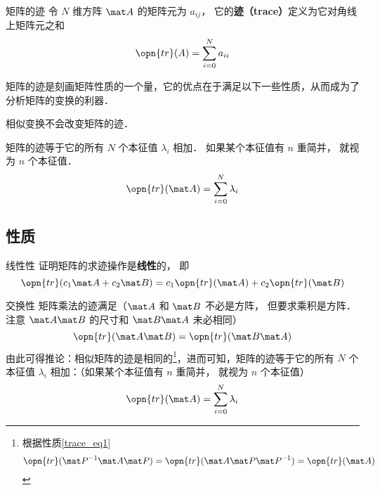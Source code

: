 

\begin{definition}{矩阵的迹}
令 $N$ 维方阵 $\mat A$ 的矩阵元为 $a_{ij}$， 它的\textbf{迹（trace）}定义为它对角线上矩阵元之和
\begin{equation}
\opn{tr}(A) = \sum_{i=0}^N a_{ii}
\end{equation}
\end{definition}

矩阵的迹是刻画矩阵性质的一个量，它的优点在于满足以下一些性质，从而成为了分析矩阵的变换的利器．



\begin{theorem}{}
相似变换不会改变矩阵的迹．
\end{theorem}

\begin{corollary}{}
矩阵的迹等于它的所有 $N$ 个本征值 $\lambda_i$ 相加． 如果某个本征值有 $n$ 重简并， 就视为 $n$ 个本征值．
\begin{equation}
\opn{tr}(\mat A) = \sum_{i=0}^N \lambda_i
\end{equation}
\end{corollary}

\subsection{性质}


\begin{exercise}{线性性}
证明矩阵的求迹操作是\textbf{线性}的， 即
\begin{equation}
\opn{tr}(c_1\mat A+c_2\mat B) = c_1\opn{tr}(\mat A) + c_2\opn{tr}(\mat B)
\end{equation}
\end{exercise}

\begin{example}{交换性}
矩阵乘法的迹满足（$\mat A$ 和 $\mat B$ 不必是方阵， 但要求乘积是方阵． 注意 $\mat A\mat B$ 的尺寸和 $\mat B\mat A$ 未必相同）
\begin{equation}\label{trace_eq1}
\opn{tr}(\mat A\mat B) = \opn{tr}(\mat B\mat A)
\end{equation}
由此可得推论：相似矩阵的迹是相同的\footnote{根据性质\autoref{trace_eq1}$$\opn{tr}(\mat P^{-1}\mat A\mat P) = \opn{tr}(\mat A\mat P\mat P^{-1}) = \opn{tr}(\mat A)$$}，进而可知，矩阵的迹等于它的所有 $N$ 个本征值 $\lambda_i$ 相加：（如果某个本征值有 $n$ 重简并， 就视为 $n$ 个本征值）
\begin{equation}
\opn{tr}(\mat A) = \sum_{i=0}^N \lambda_i
\end{equation}
\end{example}

